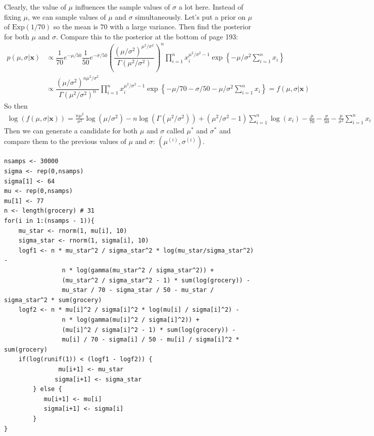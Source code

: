 \documentclass[11pt]{article}
\begin{document}
Clearly, the value of $\mu$ influences the sample values of $\sigma$ a lot here. Instead of fixing $\mu$, we can sample values of $\mu$ and $\sigma$ simultaneously. Let's put a prior on $\mu$ of $\text{Exp}(1/70)$ so the mean is $70$ with a large variance. Then find the posterior for both $\mu$ and $\sigma$. Compare this to the posterior at the bottom of page 193:
\begin{align*}
p(\mu,\sigma|\boldsymbol{x})&\propto    \dfrac{1}{70}e^{-\mu/50}\dfrac{1}{50}e^{-\sigma/50}\left(\dfrac{(\mu/\sigma^2)^{\mu^2/\sigma^2}}{\Gamma(\mu^2/\sigma^2)}\right)^n\prod_{i=1}^nx_i^{\mu^2/\sigma^2-1}\exp\left\{-\mu/\sigma^2\sum_{i=1}^nx_i\right\}\\
&\propto\dfrac{(\mu/\sigma^2)^{n\mu^2/\sigma^2}}{\Gamma(\mu^2/\sigma^2)^n}\prod_{i=1}^nx_i^{\mu^2/\sigma^2-1}\exp\left\{-\mu/70-\sigma/50-\mu/\sigma^2\sum_{i=1}^nx_i\right\}= f(\mu,\sigma|\boldsymbol{x})
\end{align*}
So then 
\begin{align*}
\log\left(f(\mu,\sigma|\boldsymbol{x})\right)=\frac{n\mu^2}{\sigma^2}\log(\mu/\sigma^2)-n\log\left(\Gamma(\mu^2/\sigma^2)\right)+(\mu^2/\sigma^2-1)\sum_{i=1}^n\log(x_i)-\frac{\mu}{70}-\frac{\sigma}{50}-\frac{\mu}{\sigma^2}\sum_{i=1}^nx_i
\end{align*}
Then we can generate a candidate for both $\mu$ and $\sigma$ called $\mu^*$ and $\sigma^*$ and compare them to the previous values of $\mu$ and $\sigma$: $(\mu^{(i)},\sigma^{(i)})$.
\begin{verbatim}
nsamps <- 30000
sigma <- rep(0,nsamps)
sigma[1] <- 64
mu <- rep(0,nsamps)
mu[1] <- 77
n <- length(grocery) # 31
for(i in 1:(nsamps - 1)){
    mu_star <- rnorm(1, mu[i], 10)
    sigma_star <- rnorm(1, sigma[i], 10)
    logf1 <- n * mu_star^2 / sigma_star^2 * log(mu_star/sigma_star^2) -
	            n * log(gamma(mu_star^2 / sigma_star^2)) +
	            (mu_star^2 / sigma_star^2 - 1) * sum(log(grocery)) -
	            mu_star / 70 - sigma_star / 50 - mu_star / sigma_star^2 * sum(grocery)
    logf2 <- n * mu[i]^2 / sigma[i]^2 * log(mu[i] / sigma[i]^2) -
	            n * log(gamma(mu[i]^2 / sigma[i]^2)) +
	            (mu[i]^2 / sigma[i]^2 - 1) * sum(log(grocery)) -
	            mu[i] / 70 - sigma[i] / 50 - mu[i] / sigma[i]^2 * sum(grocery)
    if(log(runif(1)) < (logf1 - logf2)) {
		       mu[i+1] <- mu_star
	    	  sigma[i+1] <- sigma_star
	    } else {
	       mu[i+1] <- mu[i]
	       sigma[i+1] <- sigma[i]
	    }
}


\end{verbatim}
\end{document}

